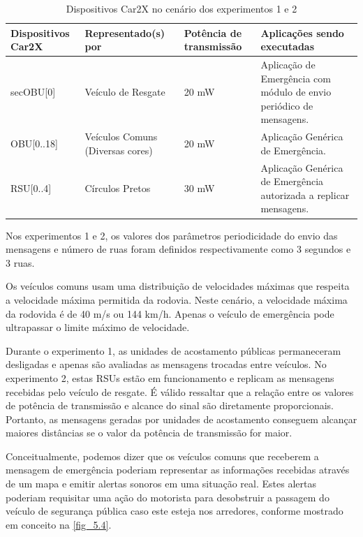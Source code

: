 \documentclass[
12pt,				%
openright,			%
oneside,			%
a4paper,			%
brazil,				%
]{abntex2}
\begin{document}
	 \begin{table}[H]
	 	\centering
	 	\renewcommand{\arraystretch}{1.5}
	 	\begin{tabular}{|p{2.4cm}|p{3.4cm}|p{2.5cm}|p{6cm}|}
	 		\hline
	 		\textbf{Dispositivos Car2X} & \textbf{Representado(s) por} & \textbf{Potência de transmissão} & \textbf{Aplicações sendo executadas} \\ \hline
	 		secOBU{[}0{]} & Veículo de Resgate & 20 mW & Aplicação de Emergência com módulo de envio periódico de mensagens. \\ \hline
	 		OBU{[}0..18{]} & Veículos Comuns (Diversas cores) & 20 mW & Aplicação Genérica de Emergência. \\ \hline
	 		RSU{[}0..4{]} & Círculos Pretos & 30 mW & Aplicação Genérica de Emergência autorizada a replicar mensagens. \\ \hline
	 	\end{tabular}
 		\caption{Dispositivos Car2X no cenário dos experimentos 1 e 2}
 		\label{tab_5.3}
	 \end{table}
	 
	\par Nos experimentos 1 e 2, os valores dos parâmetros periodicidade do envio das mensagens e número de ruas foram definidos respectivamente como 3 segundos e 3 ruas. 
	
	\par Os veículos comuns usam uma distribuição de velocidades máximas que respeita a velocidade máxima permitida da rodovia. Neste cenário, a velocidade máxima da rodovida é de 40 m/s ou 144 km/h. Apenas o veículo de emergência pode ultrapassar o limite máximo de velocidade.
	
	\par Durante o experimento 1, as unidades de acostamento públicas permaneceram desligadas e apenas são avaliadas as mensagens trocadas entre veículos. No experimento 2, estas RSUs estão em funcionamento e replicam as mensagens recebidas pelo veículo de resgate. É válido ressaltar que a relação entre os valores de potência de transmissão e alcance do sinal são diretamente proporcionais. Portanto, as mensagens geradas por unidades de acostamento conseguem alcançar maiores distâncias se o valor da potência de transmissão for maior.
	
	\par Conceitualmente, podemos dizer que os veículos comuns que receberem a mensagem de emergência poderiam representar as informações recebidas através de um mapa e emitir alertas sonoros em uma situação real. Estes alertas poderiam requisitar uma ação do motorista para desobstruir a passagem do veículo de segurança pública caso este esteja nos arredores, conforme mostrado em conceito na \autoref{fig_5.4}.
	
\end{document}
